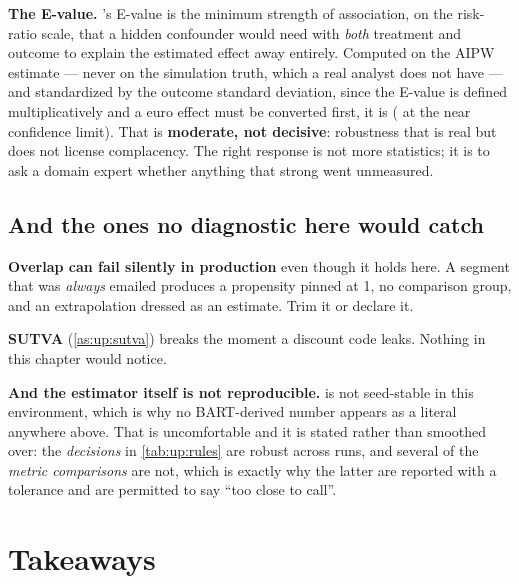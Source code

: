 \textbf{The E-value.} \citet{vanderweele2017}'s E-value is the minimum strength of association, on
the risk-ratio scale, that a hidden confounder would need with \emph{both} treatment and outcome
to explain the estimated effect away entirely. Computed on the AIPW estimate --- never on the
simulation truth, which a real analyst does not have --- and standardized by the outcome standard
deviation, since the E-value is defined multiplicatively and a euro effect must be converted
first, it is \nbOneEvalue{} (\nbOneEvalueLo{} at the near confidence limit). That is
\textbf{moderate, not decisive}: robustness that is real but does not license complacency. The
right response is not more statistics; it is to ask a domain expert whether anything that strong
went unmeasured.



\subsection*{And the ones no diagnostic here would catch}

\textbf{Overlap can fail silently in production} even though it holds here. A segment that was
\emph{always} emailed produces a propensity pinned at 1, no comparison group, and an extrapolation
dressed as an estimate. Trim it or declare it.

\textbf{SUTVA} (\cref{as:up:sutva}) breaks the moment a discount code leaks. Nothing in this
chapter would notice.

\textbf{And the estimator itself is not reproducible.}  is not seed-stable in this
environment, which is why no BART-derived number appears as a literal anywhere above. That is
uncomfortable and it is stated rather than smoothed over: the \emph{decisions} in
\cref{tab:up:rules} are robust across runs, and several of the \emph{metric comparisons} are not,
which is exactly why the latter are reported with a tolerance and are permitted to say ``too close
to call''.

\section{Takeaways}
\label{sec:up:take}

